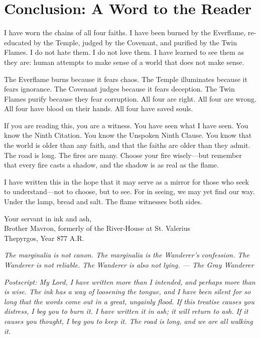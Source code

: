 \documentclass{book}
\newcommand{\citation}[1]{\textcolor{marginalia}{\small\textit{#1}}}
\begin{document}
\section{Conclusion: A Word to the Reader}

I have worn the chains of all four faiths. I have been burned by the Everflame, re-educated by the Temple, judged by the Covenant, and purified by the Twin Flames. I do not hate them. I do not love them. I have learned to see them as they are: human attempts to make sense of a world that does not make sense.

The Everflame burns because it fears chaos. The Temple illuminates because it fears ignorance. The Covenant judges because it fears deception. The Twin Flames purify because they fear corruption. All four are right. All four are wrong. All four have blood on their hands. All four have saved souls.

If you are reading this, you are a witness. You have seen what I have seen. You know the Ninth Citation. You know the Unspoken Ninth Clause. You know that the world is older than any faith, and that the faiths are older than they admit. The road is long. The fires are many. Choose your fire wisely---but remember that every fire casts a shadow, and the shadow is as real as the flame.

I have written this in the hope that it may serve as a mirror for those who seek to understand---not to choose, but to see. For in seeing, we may yet find our way. Under the lamp, bread and salt. The flame witnesses both sides.

\vspace{1em}

\noindent Your servant in ink and ash,\\
Brother Mavron, formerly of the River-House at St. Valerius\\
Thepyrgos, Year 877 A.R.

\vspace{1em}

\noindent \citation{The marginalia is not canon. The marginalia is the Wanderer's confession. The Wanderer is not reliable. The Wanderer is also not lying. --- The Gray Wanderer}

\vspace{1em}

\noindent \textit{Postscript: My Lord, I have written more than I intended, and perhaps more than is wise. The ink has a way of loosening the tongue, and I have been silent for so long that the words come out in a great, ungainly flood. If this treatise causes you distress, I beg you to burn it. I have written it in ash; it will return to ash. If it causes you thought, I beg you to keep it. The road is long, and we are all walking it.}
\end{document}
